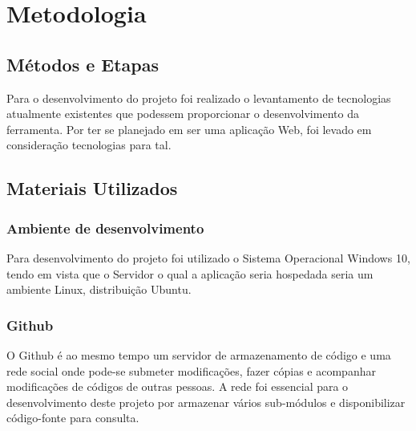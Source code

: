 \chapter{Metodologia}
\label{c.metodologia}

\section{Métodos e Etapas}
\label{s.metodoseetapas}

Para o desenvolvimento do projeto foi realizado o levantamento de tecnologias atualmente existentes que podessem proporcionar o desenvolvimento da ferramenta. Por ter se planejado em ser uma aplicação Web, foi levado em consideração tecnologias para tal.


\section{Materiais Utilizados}
\label{s.materiaisutilizados}

\subsection{Ambiente de desenvolvimento}
\label{s.windows}

Para desenvolvimento do projeto foi utilizado o Sistema Operacional Windows 10, tendo em vista que o Servidor o qual a aplicação seria hospedada seria um ambiente Linux, distribuição Ubuntu.

\subsection{Github}
\label{s.github}

O Github é ao mesmo tempo um servidor de armazenamento de código e uma rede social onde pode-se submeter modificações, fazer cópias e acompanhar modificações de códigos de outras pessoas. A rede foi essencial para o desenvolvimento deste projeto por armazenar vários sub-módulos e disponibilizar código-fonte para consulta.
